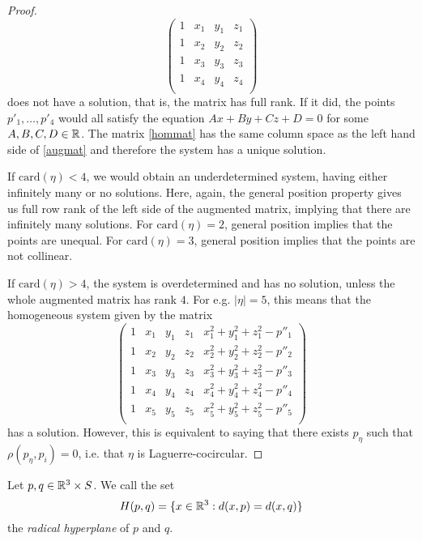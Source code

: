 \begin{proof}
\begin{equation}
	\begin{pmatrix}
		1 & x_1 & y_1 & z_1 \\
		1 & x_2 & y_2 & z_2 \\
		1 & x_3 & y_3 & z_3 \\
		1 & x_4 & y_4 & z_4 \\
	\end{pmatrix}
	\end{equation}
	does not have a solution, that is, the matrix has full rank. If it did, the points $p'_1,\dots,p'_4$ would all satisfy the equation $Ax+By+Cz+D=0$ for some $A,B,C,D \in \mathbb{R}$. The matrix \ref{hommat} has the same column space as the left hand side of \ref{augmat} and therefore the system has a unique solution.

	If $\mathrm{card}(\eta)<4$, we would obtain an underdetermined system, having either infinitely many or no solutions.  Here, again, the general position property gives us full row rank of the left side of the augmented matrix, implying that there are infinitely many solutions. For $\mathrm{card}(\eta)=2$, general position implies that the points are unequal. For $\mathrm{card}(\eta) =3$, general position implies that the points are not collinear.


	If $\mathrm{card}(\eta)>4$, the system is overdetermined and has no solution, unless the whole augmented matrix has rank $4$. For e.g. $|\eta|=5$, this means that the homogeneous system given by the matrix 
	\begin{equation}\label{circmat}
	\begin{pmatrix}
		1 & x_1 & y_1 & z_1 & x_1^2 + y_1^2 + z_1^2 - p''_1  \\
		1 & x_2 & y_2 & z_2 & x_2^2 + y_2^2 + z_2^2 - p''_2  \\
		1 & x_3 & y_3 & z_3 & x_3^2 + y_3^2 + z_3^2 - p''_3  \\
		1 & x_4 & y_4 & z_4 & x_4^2 + y_4^2 + z_4^2 - p''_4  \\
		1 & x_5 & y_5 & z_5 & x_5^2 + y_5^2 + z_5^2 - p''_5  \\
	\end{pmatrix}
	\end{equation}
	has a solution. However, this is equivalent to saying that there exists $p_\eta$ such that $\rho(p_\eta,p_i)=0$, i.e. that $\eta$ is Laguerre-cocircular.
\end{proof}

\begin{definition} Let $p,q \in {\mathbb R^3}\times S$. We call the set 
	$$H(p,q) = \{ x\in {\mathbb R^3}: d(x,p) = d(x,q) \}$$
	the \textit{radical hyperplane} of $p$ and $q$.
\end{definition}

